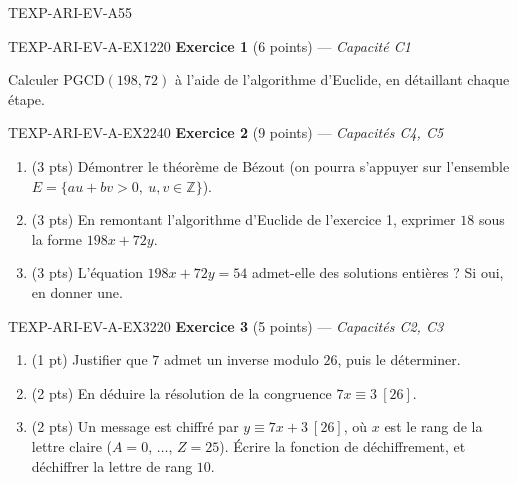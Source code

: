 

\begin{evaluation}{TEXP-ARI-EV-A}{55}

\begin{exercice}{TEXP-ARI-EV-A-EX1}{2}{20}
\textbf{Exercice 1} (6 points) --- \textit{Capacité C1}

\medskip

Calculer $\mathrm{PGCD}(198,72)$ à l'aide de l'algorithme d'Euclide, en détaillant chaque étape.
\end{exercice}

\begin{exercice}{TEXP-ARI-EV-A-EX2}{2}{40}
\textbf{Exercice 2} (9 points) --- \textit{Capacités C4, C5}

\medskip

\begin{enumerate}
  \item (3 pts) Démontrer le théorème de Bézout (on pourra s'appuyer sur l'ensemble $E=\{au+bv>0,\ u,v\in\mathbb{Z}\}$).
  \item (3 pts) En remontant l'algorithme d'Euclide de l'exercice 1, exprimer $18$ sous la forme $198x+72y$.
  \item (3 pts) L'équation $198x+72y=54$ admet-elle des solutions entières ? Si oui, en donner une.
\end{enumerate}
\end{exercice}

\begin{exercice}{TEXP-ARI-EV-A-EX3}{2}{20}
\textbf{Exercice 3} (5 points) --- \textit{Capacités C2, C3}

\medskip

\begin{enumerate}
  \item (1 pt) Justifier que $7$ admet un inverse modulo $26$, puis le déterminer.
  \item (2 pts) En déduire la résolution de la congruence $7x\equiv3\ [26]$.
  \item (2 pts) Un message est chiffré par $y\equiv7x+3\ [26]$, où $x$ est le rang de la lettre claire ($A=0$, $\dots$, $Z=25$). Écrire la fonction de déchiffrement, et déchiffrer la lettre de rang $10$.
\end{enumerate}
\end{exercice}

\end{evaluation}
